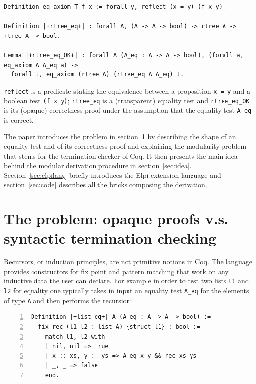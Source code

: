 \documentclass[a4paper,UKenglish,cleveref, autoref]{lipics-v2019}
\begin{document}
\begin{lstlisting}
Definition eq_axiom T f x := forall y, reflect (x = y) (f x y).

Definition |+rtree_eq+| : forall A, (A -> A -> bool) -> rtree A -> rtree A -> bool.

Lemma |+rtree_eq_OK+| : forall A (A_eq : A -> A -> bool), (forall a, eq_axiom A A_eq a) ->
  forall t, eq_axiom (rtree A) (rtree_eq A A_eq) t.
\end{lstlisting}

\noindent
\lstinline+reflect+
is a predicate stating the equivalence between a proposition \lstinline+x = y+
and a boolean test \lstinline+(f x y)+;
\lstinline+rtree_eq+ is a (transparent) equality test and
\lstinline+rtree_eq_OK+ is its (opaque) correctness proof
under the assumption that the equality test \lstinline+A_eq+ is correct.

The paper introduces the problem in
section~\ref{sec:problem} by describing the shape of an equality test
and of its correctness proof and explaining the modularity problem
that stems for the termination checker of Coq. It then
presents the main idea behind the
modular derivation procedure in section~\ref{sec:idea}.
Section~\ref{sec:elpilang} briefly introduces the Elpi extension language
and section~\ref{sec:code} describes all the bricks composing the
derivation.


\section{The problem: opaque proofs v.s. syntactic termination checking} %
\label{sec:problem}

Recursors, or induction principles, are not primitive notions in Coq.
The language provides constructors for fix point and pattern matching
that work on any inductive data the user can declare.
For example in order to test two lists \lstinline+l1+ and \lstinline+l2+ for
equality one typically takes in input an equality test \lstinline+A_eq+
for the elements of type \lstinline+A+ and then performs the
recursion:

\begin{lstlisting}[numbers=left]
Definition |+list_eq+| A (A_eq : A -> A -> bool) :=
  fix rec (l1 l2 : list A) {struct l1} : bool :=
    match l1, l2 with
    | nil, nil => true
    | x :: xs, y :: ys => A_eq x y && rec xs ys
    | _, _ => false
    end.
\end{lstlisting}
\end{document}
